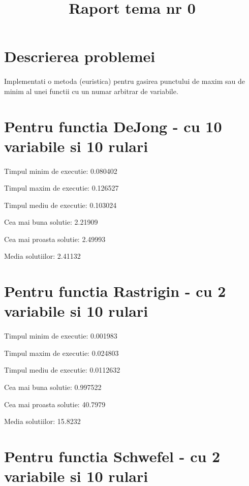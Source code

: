 \documentclass[paper=a4, fontsize=11pt]{scrartcl}
\date{}
\title{\textbf{Raport tema nr 0}}
\begin{document}
\maketitle
\vspace{-7em}
\section{Descrierea problemei}
\paragraph{}
Implementati o metoda (euristica) pentru gasirea punctului de maxim sau de minim al unei functii cu un numar arbitrar de variabile.

\section{Pentru functia DeJong - cu 10 variabile si 10 rulari}
\paragraph{}
Timpul minim de executie: 0.080402

Timpul maxim de executie: 0.126527

Timpul mediu de executie: 0.103024

Cea mai buna solutie: 2.21909

Cea mai proasta solutie: 2.49993

Media solutiilor: 2.41132

\section{Pentru functia Rastrigin - cu 2 variabile si 10 rulari}
\paragraph{}
Timpul minim de executie: 0.001983

Timpul maxim de executie: 0.024803

Timpul mediu de executie: 0.0112632

Cea mai buna solutie: 0.997522

Cea mai proasta solutie: 40.7979

Media solutiilor: 15.8232

\section{Pentru functia Schwefel - cu 2 variabile si 10 rulari}
\end{document}
